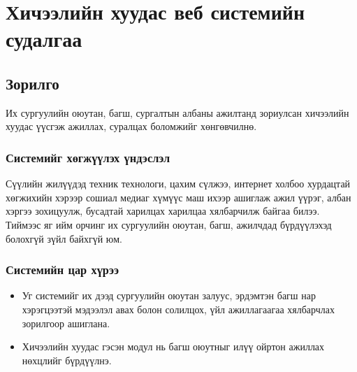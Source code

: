 
\chapter{Хичээлийн хуудас веб системийн судалгаа} %
\label{Chapter1} %


\newcommand{\keyword}[1]{\textbf{#1}}
\newcommand{\tabhead}[1]{\textbf{#1}}
\newcommand{\code}[1]{\texttt{#1}}
\newcommand{\file}[1]{\texttt{\bfseries#1}}
\newcommand{\option}[1]{\texttt{\itshape#1}}

\section{Зорилго}
\hspace{1cm}Их сургуулийн оюутан, багш, сургалтын албаны ажилтанд зориулсан хичээлийн хуудас үүсгэж ажиллах, суралцах боломжийг хөнгөвчилнө.

\subsection{Системийг хөгжүүлэх үндэслэл}
\hspace{1cm}Сүүлийн жилүүдэд техник технологи, цахим сүлжээ, интернет холбоо хурдацтай хөгжихийн хэрээр сошиал медиаг хүмүүс маш ихээр ашиглаж ажил үүрэг, албан хэргээ зохицуулж, бусадтай харилцах харилцаа хялбарчилж байгаа билээ. Тиймээс яг ийм орчинг их сургуулийн оюутан, багш, ажилчдад бүрдүүлэхэд болохгүй зүйл байхгүй юм.

\subsection{Системийн цар хүрээ}
\begin{itemize}
	\item Уг системийг их дээд сургуулийн оюутан залуус, эрдэмтэн багш нар хэрэгцээтэй мэдээлэл авах болон солилцох, үйл ажиллагаагаа хялбарчлах зорилгоор ашиглана.
	\item Хичээлийн хуудас гэсэн модул нь багш оюутныг илүү ойртон ажиллах нөхцлийг бүрдүүлнэ.
\end{itemize}

